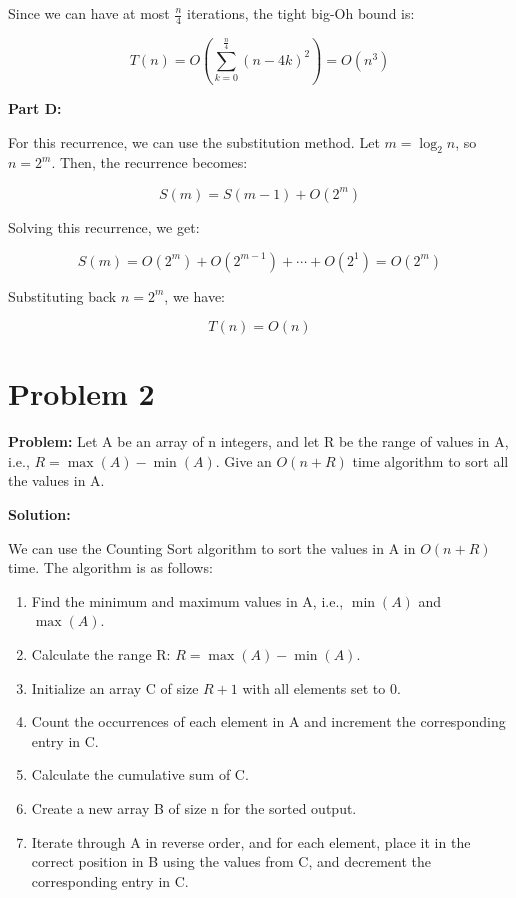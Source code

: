 \documentclass[11pt]{article}
\begin{document}
    Since we can have at most $\frac{n}{4}$ iterations, the tight big-Oh bound is:

    $$
    T(n) = O\left(\sum_{k=0}^{\frac{n}{4}} (n - 4k)^2\right) = O(n^3)
    $$

    \textbf{Part D:}

    For this recurrence, we can use the substitution method. Let $m = \log_2 n$, so $n = 2^m$. Then, the recurrence becomes:

    $$
    S(m) = S(m - 1) + O(2^m)
    $$

    Solving this recurrence, we get:

    $$
    S(m) = O(2^m) + O(2^{m-1}) + \cdots + O(2^1) = O(2^m)
    $$

    Substituting back $n = 2^m$, we have:

    $$
    T(n) = O(n)
    $$


    \section{Problem 2}

    \textbf{Problem:} Let A be an array of n integers, and let R be the range of values in A, i.e.,
    $R = \max(A) - \min(A)$. Give an $O(n + R)$ time algorithm to sort all the values in A.

    \textbf{Solution:}

    We can use the Counting Sort algorithm to sort the values in A in $O(n + R)$ time. The algorithm is as follows:

    \begin{enumerate}
        \item Find the minimum and maximum values in A, i.e., $\min(A)$ and $\max(A)$.
        \item Calculate the range R: $R = \max(A) - \min(A)$.
        \item Initialize an array C of size $R+1$ with all elements set to 0.
        \item Count the occurrences of each element in A and increment the corresponding entry in C.
        \item Calculate the cumulative sum of C.
        \item Create a new array B of size n for the sorted output.
        \item Iterate through A in reverse order, and for each element, place it in the correct position in B using the values from C, and decrement the corresponding entry in C.
    \end{enumerate}
\end{document}
